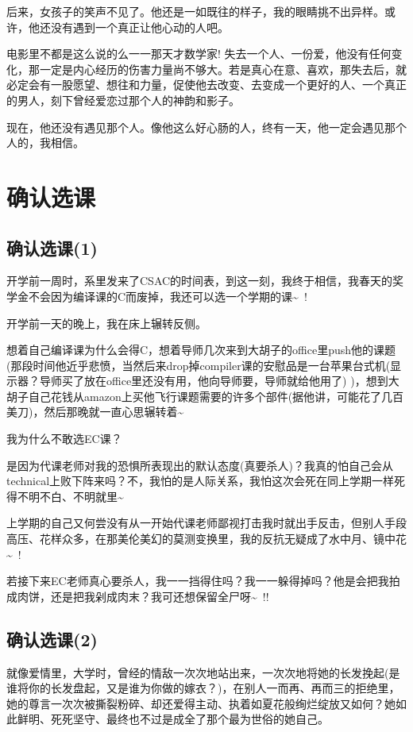 \documentclass[12pt]{book}
\begin{document}
后来，女孩子的笑声不见了。他还是一如既往的样子，我的眼睛挑不出异样。或许，他还没有遇到一个真正让他心动的人吧。

电影里不都是这么说的么一一那天才数学家! 失去一个人、一份爱，他没有任何变化，那一定是内心经历的伤害力量尚不够大。若是真心在意、喜欢，那失去后，就必定会有一股愿望、想往和力量，促使他去改变、去变成一个更好的人、一个真正的男人，刻下曾经爱恋过那个人的神韵和影子。

现在，他还没有遇见那个人。像他这么好心肠的人，终有一天，他一定会遇见那个人的，我相信。
\chapter{确认选课}
\label{sec-19}
\section{确认选课(1)}
\label{sec-19-1}

开学前一周时，系里发来了CSAC的时间表，到这一刻，我终于相信，我春天的奖学金不会因为编译课的C而废掉，我还可以选一个学期的课\textasciitilde{}~!

开学前一天的晚上，我在床上辗转反侧。

想着自己编译课为什么会得C，想着导师几次来到大胡子的office里push他的课题(那段时间他近乎悲愤，当然后来drop掉compiler课的安慰品是一台苹果台式机(显示器？导师买了放在office里还没有用，他向导师要，导师就给他用了) )，想到大胡子自己花钱从amazon上买他飞行课题需要的许多个部件(据他讲，可能花了几百美刀)，然后那晚就一直心思辗转着\textasciitilde{}~

我为什么不敢选EC课？

是因为代课老师对我的恐惧所表现出的默认态度(真要杀人)？我真的怕自己会从technical上败下阵来吗？不，我怕的是人际关系，我怕这次会死在同上学期一样死得不明不白、不明就里\textasciitilde{}~ 

上学期的自己又何尝没有从一开始代课老师鄙视打击我时就出手反击，但别人手段高压、花样众多，在那美伦美幻的莫测变换里，我的反抗无疑成了水中月、镜中花\textasciitilde{}~!

若接下来EC老师真心要杀人，我一一挡得住吗？我一一躲得掉吗？他是会把我拍成肉饼，还是把我剁成肉末？我可还想保留全尸呀\textasciitilde{}~!!

\section{确认选课(2)}
\label{sec-19-2}

就像爱情里，大学时，曾经的情敌一次次地站出来，一次次地将她的长发挽起(是谁将你的长发盘起，又是谁为你做的嫁衣？)，在别人一而再、再而三的拒绝里，她的尊言一次次被撕裂粉碎、却还爱得主动、执着如夏花般绚烂绽放又如何？她如此鲜明、死死坚守、最终也不过是成全了那个最为世俗的她自己。
\end{document}
